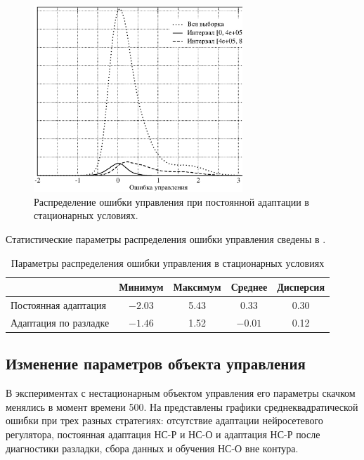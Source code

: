 \begin{figure}[h]
\centering
\includegraphics[width=0.7\textwidth,%
  height=0.3\textheight]{perm_adopt_distrib_rus}
\caption{Распределение ошибки управления при постоянной адаптации в
  стационарных условиях.}
\label{fig:perm_adopt_distrib_rus}
\end{figure}

Статистические параметры распределения ошибки управления сведены в
.

\begin{table}
  \caption{Параметры распределения ошибки управления в стационарных условиях}
  \label{tabl:steady_state_distrib}
  \begin{tabular}{|l|c|c|c|c|}
    \hline
    &Минимум&Максимум&Среднее&Дисперсия\\
    \hline
    Постоянная адаптация&
    $-2.03$ & 5.43 & 0.33 & 0.30\\
    \hline
    Адаптация по разладке&
    $-1.46$ & 1.52 & $-0.01$ & 0.12\\
    \hline
  \end{tabular}
\end{table}

\subsection{Изменение параметров объекта управления}

В экспериментах с нестационарным объектом управления его параметры
скачком менялись в момент времени 500.  На
 представлены графики
среднеквадратической ошибки при трех разных стратегиях: отсутствие
адаптации нейросетевого регулятора, постоянная адаптация НС-Р и НС-О и
адаптация НС-Р после диагностики разладки, сбора данных и обучения
НС-О вне контура.

